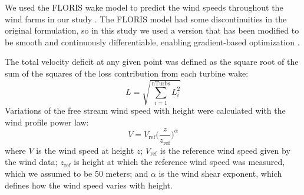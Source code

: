 We used the FLORIS wake model to predict the wind speeds throughout the wind farms in our study \citep{gebraad2016wind}. 
The FLORIS model had some discontinuities in the original formulation, so in this study we used a version that has been modified to be smooth and continuously differentiable, enabling gradient-based optimization \citep{thomas2017improving}.

The total velocity deficit at any given point was defined as the square root of the sum of the squares of the loss contribution from each turbine wake:
\begin{equation}
L = \sqrt{\sum_{i=1}^\text{nTurbs}L_i^2}
\end{equation}
\noindent Variations of the free stream wind speed with height were calculated with the wind profile power law: 
\begin{equation}
V = V_{\text{ref}}\Big(\frac{z}{z_{\text{ref}}}\Big)^\alpha
\label{Eq:shear}
\end{equation}
where $V$ is the wind speed at height $z$; $V_{\text{ref}}$ is the reference wind speed given by the wind data; $z_{\text{ref}}$ is height at which the reference wind speed was measured, which we assumed to be 50 meters;  and $\alpha$ is the wind shear exponent, which defines how the wind speed varies with height.